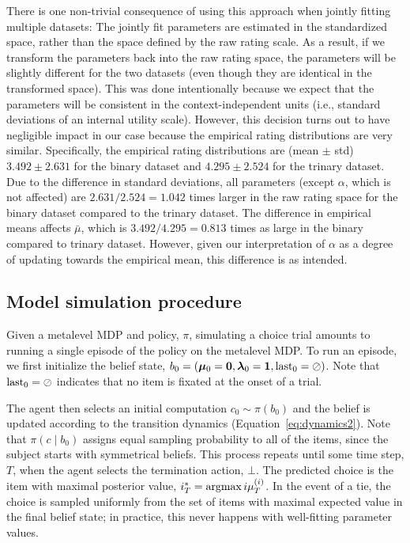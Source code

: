 There is one non-trivial consequence of using this approach when jointly fitting multiple datasets: The jointly fit parameters are estimated in the standardized space, rather than the space defined by the raw rating scale. As a result, if we transform the parameters back into the raw rating space, the parameters will be slightly different for the two datasets (even though they are identical in the transformed space). This was done intentionally because we expect that the parameters will be consistent in the context-independent units (i.e., standard deviations of an internal utility scale). However, this decision turns out to have negligible impact in our case because the empirical rating distributions are very similar. Specifically, the empirical rating distributions are (mean $\pm$ std) $3.492 \pm 2.631$ for the binary dataset and $4.295 \pm 2.524$ for the trinary dataset. Due to the difference in standard deviations, all parameters (except $\alpha$, which is not affected) are $2.631 / 2.524 = 1.042$ times larger in the raw rating space for the binary dataset compared to the trinary dataset. The difference in empirical means affects $\bar{\mu}$, which is $3.492 / 4.295 = 0.813$ times as large in the binary compared to trinary dataset. However, given our interpretation of $\alpha$ as a degree of updating towards the empirical mean, this difference is as intended.

\subsection{Model simulation procedure}

Given a metalevel MDP and policy, $\pi$, simulating a choice trial amounts to running a single episode of the policy on the metalevel MDP. To run an episode, we first initialize the belief state, $b_0 = (\boldsymbol{\mu}_0 = \mathbf{0}, \boldsymbol{\lambda}_0 = \mathbf{1}, \mathrm{last}_0 = \oslash)$. Note that $\mathrm{last}_0 = \oslash$ indicates that no item is fixated at the onset of a trial.

The agent then selects an initial computation $c_{0}\sim\pi(b_{0})$ and the belief is updated according to the transition dynamics (Equation~\ref{eq:dynamics2}). Note that $\pi(c \mid b_{0})$ assigns equal sampling probability to all of the items, since the subject starts with symmetrical beliefs. This process repeats until some time step, $T$, when the agent selects the termination action, $\bot$. The predicted choice is the item with maximal posterior value, $i^*_T = \operatorname*{argmax}{i} \mu_T^{(i)}$. In the event of a tie, the choice is sampled uniformly from the set of items with maximal expected value in the final belief state; in practice, this never happens with well-fitting parameter values.

